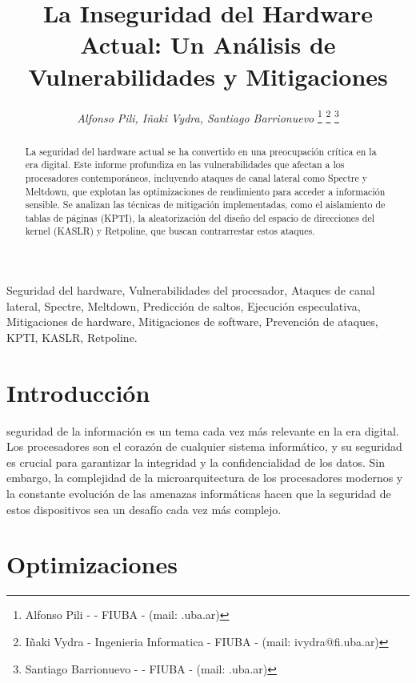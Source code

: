 \documentclass[lettersize,compsoc]{IEEEtran}
\begin{document}
\title{La Inseguridad del Hardware Actual: Un Análisis de Vulnerabilidades y Mitigaciones }  

\author{
\textit{Alfonso Pili, Iñaki Vydra, Santiago Barrionuevo}
\thanks{Alfonso Pili -  - FIUBA - (mail: .uba.ar)}
\thanks{Iñaki Vydra - Ingenieria Informatica - FIUBA - (mail: ivydra@fi.uba.ar)}
\thanks{Santiago Barrionuevo - - FIUBA - (mail: .uba.ar)}
}

\maketitle

\begin{abstract} 
  La seguridad del hardware actual se ha convertido en una preocupación crítica en la era digital. Este informe profundiza en las vulnerabilidades que afectan a los procesadores contemporáneos, incluyendo ataques de canal lateral como Spectre y Meltdown, que explotan las optimizaciones de rendimiento para acceder a información sensible. Se analizan las técnicas de mitigación implementadas, como el aislamiento de tablas de páginas (KPTI), la aleatorización del diseño del espacio de direcciones del kernel (KASLR) y Retpoline, que buscan contrarrestar estos ataques.
\end{abstract}

\begin{IEEEkeywords} 
  Seguridad del hardware, Vulnerabilidades del procesador, Ataques de canal lateral, Spectre, Meltdown, Predicción de saltos, Ejecución especulativa, Mitigaciones de hardware, Mitigaciones de software, Prevención de ataques, KPTI, KASLR, Retpoline.
\end{IEEEkeywords}

\section{Introducción}
 seguridad de la información es un tema cada vez más relevante en la era digital. Los procesadores son el corazón de cualquier sistema informático, y su seguridad es crucial para garantizar la integridad y la confidencialidad de los datos. Sin embargo, la complejidad de la microarquitectura de los procesadores modernos y la constante evolución de las amenazas informáticas hacen que la seguridad de estos dispositivos sea un desafío cada vez más complejo.

\section{Optimizaciones}
\end{document}
